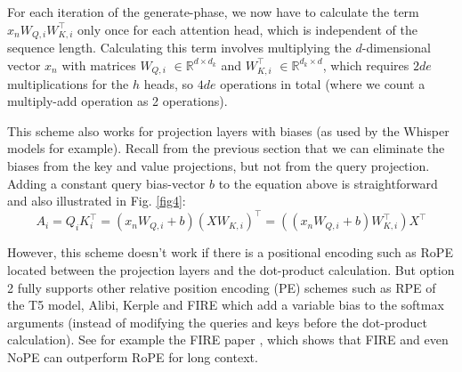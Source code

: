 \documentclass{article}
\newcommand{\eR}[2]{$\in \mathbb{R}^{#1 \times #2}$} %
\begin{document}
For each iteration of the generate-phase, we now have to calculate the term $x_n W_{Q,i} W_{K,i}^\top$ only once for each attention head, which is independent of the sequence length. Calculating this term involves multiplying the $d$-dimensional vector $x_n$ with matrices $W_{Q,i}$ \eR{d}{d_k} and $W_{K,i}^\top$ \eR{d_k}{d}, which requires $2 d e$ multiplications for the $h$ heads, so $4 d e$ operations in total (where we count a multiply-add operation as 2 operations).

This scheme also works for projection layers with biases (as used by the Whisper models for example). Recall from the previous section that we can eliminate the biases from the key and value projections, but not from the query projection. Adding a constant query bias-vector $b$ to the equation above is straightforward and also illustrated in Fig. \ref{fig4}:
\begin{equation*}
  A_i = Q_i K_i^\top = (x_n W_{Q,i} + b) (X W_{K,i})^\top = ((x_n W_{Q,i} + b) W_{K,i}^\top) X^\top
\end{equation*}

However, this scheme doesn’t work if there is a positional encoding such as RoPE located between the projection layers and the dot-product calculation. But option 2 fully supports other relative position encoding (PE) schemes such as RPE of the T5 model, Alibi, Kerple and FIRE \citep{FIRE} which add a variable bias to the softmax arguments (instead of modifying the queries and keys before the dot-product calculation). See for example the FIRE paper \citep{FIRE}, which shows that FIRE and even NoPE can outperform RoPE for long context.
\end{document}
